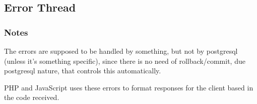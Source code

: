 \subsection{Error Thread}\label{subsec:error-thread}
\subsubsection{Notes}\label{subsubsec:notes}
\begin{flushleft}
    The errors are supposed to be handled by something, but not by postgresql (unless it's something specific), since
    there is no need of rollback/commit, due postgresql nature, that controls this automatically.
\end{flushleft}
\begin{flushleft}
    PHP and JavaScript uses these errors to format responses for the client based in the code received.
\end{flushleft}

